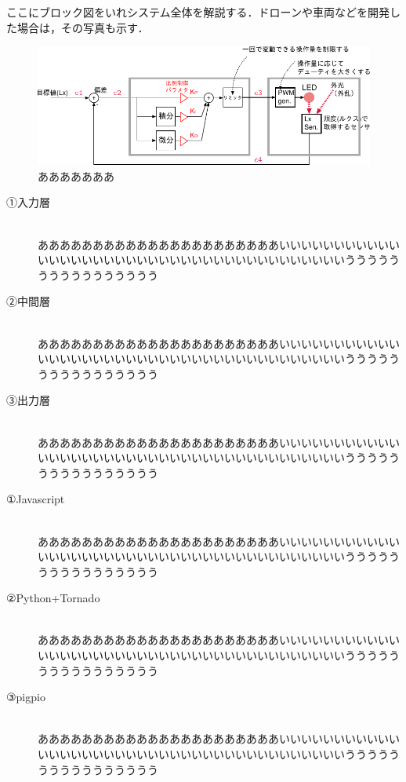 
ここにブロック図をいれシステム全体を解説する．ドローンや車両などを開発した場合は，その写真も示す．
\begin{figure}[h]
\begin{center}
\includegraphics[width=\textwidth]{fig/system.pdf}
\caption{あああああああ}
\end{center}
\end{figure}
\newpage

\begin{description} 
	\item[①入力層]~\\
	ああああああああああああああああああああああいいいいいいいいいいいいいいいいいいいいいいいいいいいいいいいいいいいいいいいうううううううううううううううう
	\item[②中間層]~\\
	ああああああああああああああああああああああいいいいいいいいいいいいいいいいいいいいいいいいいいいいいいいいいいいいいいいうううううううううううううううう
	\item[③出力層]~\\
	ああああああああああああああああああああああいいいいいいいいいいいいいいいいいいいいいいいいいいいいいいいいいいいいいいいうううううううううううううううう
\end{description}
\newpage

\begin{description} 
	\item[①Javascript]~\\
	ああああああああああああああああああああああいいいいいいいいいいいいいいいいいいいいいいいいいいいいいいいいいいいいいいいうううううううううううううううう
	\item[②Python+Tornado]~\\
	ああああああああああああああああああああああいいいいいいいいいいいいいいいいいいいいいいいいいいいいいいいいいいいいいいいうううううううううううううううう
	\item[③pigpio]~\\
	ああああああああああああああああああああああいいいいいいいいいいいいいいいいいいいいいいいいいいいいいいいいいいいいいいいうううううううううううううううう
\end{description}
\newpage


